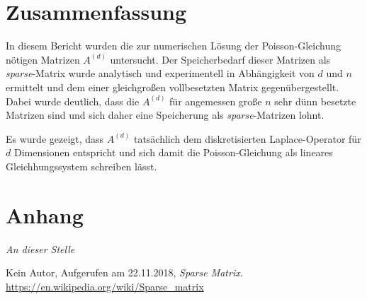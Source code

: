 \documentclass[smallheadings]{scrartcl}
\begin{document}
\section{Zusammenfassung}

In diesem Bericht wurden die zur numerischen Lösung der Poisson-Gleichung nötigen Matrizen $A^{(d)}$ untersucht. Der Speicherbedarf dieser Matrizen als \textit{sparse}-Matrix wurde analytisch und experimentell in Abhängigkeit von $d$ und $n$ ermittelt und dem einer gleichgroßen vollbesetzten Matrix gegenübergestellt. Dabei wurde deutlich, dass die $A^{(d)}$ für angemessen große $n$ sehr dünn besetzte Matrizen sind und sich daher eine Speicherung als \textit{sparse}-Matrizen lohnt. 

Es wurde gezeigt, dass $A^{(d)}$ tatsächlich dem diskretisierten Laplace-Operator für $d$ Dimensionen entspricht und sich damit die Poisson-Gleichung als lineares Gleichhungssystem schreiben lässt. 

\appendix
\section{Anhang}
\emph{An dieser Stelle}

\begin{thebibliography}{9}
 Kein Autor, Aufgerufen am 22.11.2018, \textit{Sparse Matrix}. 
\url{https://en.wikipedia.org/wiki/Sparse_matrix}
\end{thebibliography}


\end{document}
